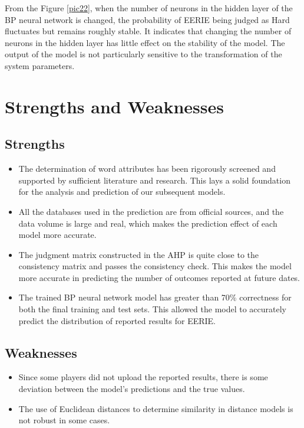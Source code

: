 \documentclass[12pt]{article}  %
\begin{document}
From the Figure \ref{pic22}, when the number of neurons in the hidden layer of the BP neural network is changed, the probability of EERIE being judged as Hard fluctuates but remains roughly stable. It indicates that changing the number of neurons in the hidden layer has little effect on the stability of the model. The output of the model is not particularly sensitive to the transformation of the system parameters.

\section{Strengths and Weaknesses}
\subsection{Strengths}
\begin{itemize}
	\setlength{\parsep}{0ex} 
	\setlength{\topsep}{2ex} 
	\setlength{\itemsep}{1ex} 
	\item The determination of word attributes has been rigorously screened and supported by sufficient literature and research. This lays a solid foundation for the analysis and prediction of our subsequent models.
	
	\item All the databases used in the prediction are from official sources, and the data volume is large and real, which makes the prediction effect of each model more accurate.
	
	\item The judgment matrix constructed in the AHP is quite close to the consistency matrix and passes the consistency check. This makes the model more accurate in predicting the number of outcomes reported at future dates.
	
	\item The trained BP neural network model has greater than 70\% correctness for both the final training and test sets. This allowed the model to accurately predict the distribution of reported results for EERIE.
\end{itemize}

\subsection{Weaknesses}
\begin{itemize}
	\setlength{\parsep}{0ex} 
	\setlength{\topsep}{2ex} 
	\setlength{\itemsep}{1ex} 
	\item Since some players did not upload the reported results, there is some deviation between the model's predictions and the true values.
	
	\item The use of Euclidean distances to determine similarity in distance models is not robust in some cases.
\end{itemize}
\end{document}
